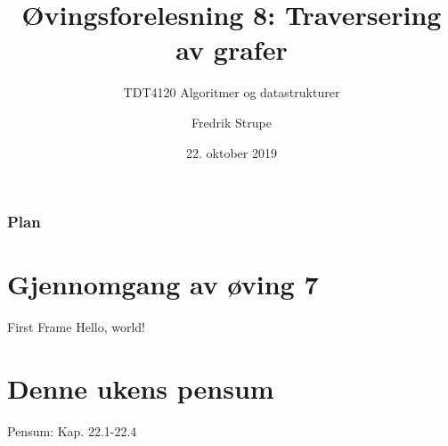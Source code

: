 \documentclass[14pt]{beamer}
\title{Øvingsforelesning 8: Traversering av grafer}
\subtitle{TDT4120 Algoritmer og datastrukturer}
\date{22. oktober 2019}
\author{Fredrik Strupe}
\institute{NTNU}
\begin{document}
\maketitle
\begin{frame}
    \frametitle{Plan}
    \tableofcontents
\end{frame}

\section{Gjennomgang av øving 7}
\begin{frame}{First Frame}
    Hello, world!
\end{frame}

\section{Denne ukens pensum}
\begin{frame}[standout]
    Pensum: Kap. 22.1-22.4
\end{frame}
\end{document}
